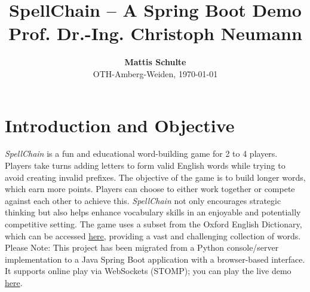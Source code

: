 \documentclass{article}
\begin{document}
\title{\textbf{SpellChain -- A Spring Boot Demo}\\ \vspace{0.2cm}\large \textbf{Prof. Dr.-Ing. Christoph Neumann}}
\author{\normalsize\textbf{Mattis Schulte}\\ {\small OTH-Amberg-Weiden, \today}}\date{}
\maketitle

\section*{Introduction and Objective}
\textit{SpellChain} is a fun and educational word-building game for 2 to 4 players. Players take turns adding letters to form valid English words while trying to avoid creating invalid prefixes. The objective of the game is to build longer words, which earn more points. Players can choose to either work together or compete against each other to achieve this. \textit{SpellChain} not only encourages strategic thinking but also helps enhance vocabulary skills in an enjoyable and potentially competitive setting. The game uses a subset from the Oxford English Dictionary, which can be accessed \href{https://raw.githubusercontent.com/sujithps/Dictionary/master/Oxford%20English%20Dictionary.txt}{\textcolor{links}{here}}, providing a vast and challenging collection of words. Please Note: This project has been migrated from a Python console/server implementation to a Java Spring Boot application with a browser-based interface. It supports online play via WebSockets (STOMP); you can play the live demo \href{https://spellchain.mattisschulte.io/}{\textcolor{links}{here}}.
\end{document}
